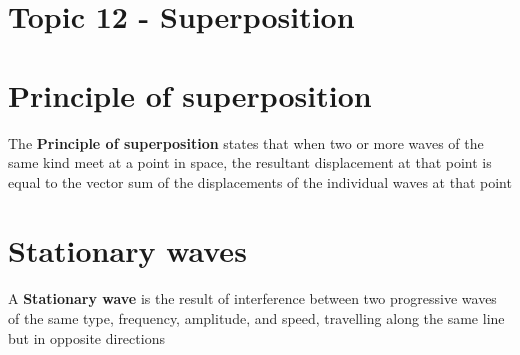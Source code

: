 \documentclass[a4paper, 10pt]{article}
\begin{document}
\section*{Topic 12 - Superposition}

\section{Principle of superposition}
\begin{framed}
   The \textbf{Principle of superposition} states that when two or more waves of the same kind meet at a point in space, the resultant displacement at that point is equal to the vector sum of the displacements of the individual waves at that point
\end{framed}	

\section{Stationary waves}

\begin{framed}
   A \textbf{Stationary wave} is the result of interference between two progressive waves of the same type, frequency, amplitude, and speed, travelling along the same line but in opposite directions
\end{framed}	
\end{document}
